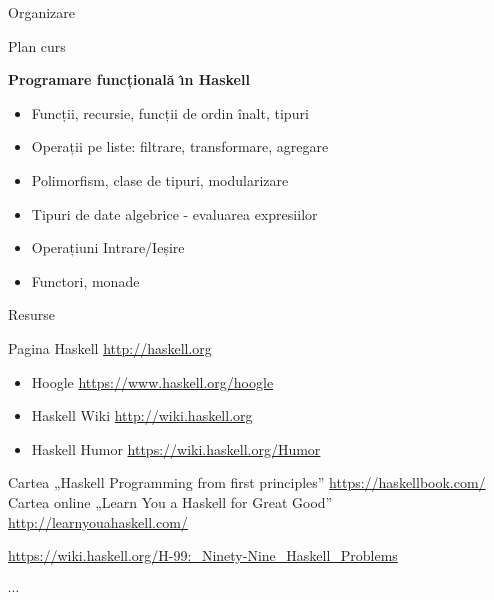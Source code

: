 \documentclass[xcolor=pdftex,romanian,colorlinks]{beamer}
\begin{document}
\begin{section}{Organizare}
\begin{frame}{Plan curs}

 {\bf Programare funcțională \^{\i}n Haskell}
 
\begin{itemize}
 

\item Funcții, recursie, funcții de ordin înalt, tipuri
\item Operații pe liste: filtrare, transformare, agregare

\item Polimorfism, clase de tipuri, modularizare
\item Tipuri de date algebrice - evaluarea expresiilor
\item Operațiuni Intrare/Ieșire
\item Functori, monade
\end{itemize}
\end{frame}

\begin{frame}{Resurse}
\begin{itemize}
\vitem Pagina Haskell \url{http://haskell.org}
\begin{itemize}
\item Hoogle \url{https://www.haskell.org/hoogle}
\item Haskell Wiki \url{http://wiki.haskell.org}
\item Haskell Humor \url{https://wiki.haskell.org/Humor}
\end{itemize}

\vitem Cartea „Haskell Programming from first principles”
\url{https://haskellbook.com/}
\vitem Cartea online „Learn You a Haskell for Great Good” \url{http://learnyouahaskell.com/}

\vitem \url{https://wiki.haskell.org/H-99:_Ninety-Nine_Haskell_Problems}

\vitem $\cdots$
\end{itemize}
\end{frame}


\end{section}
\end{document}
